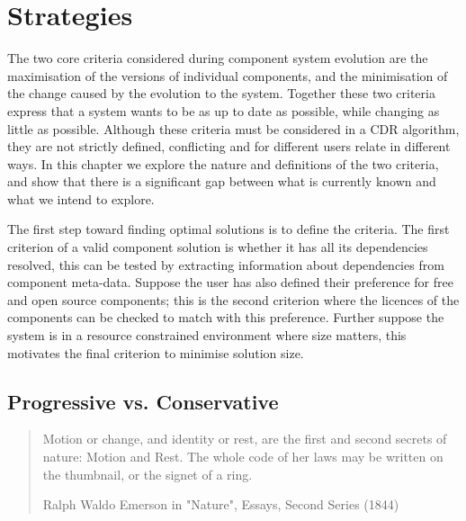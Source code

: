 \chapter{Strategies}
\label{strategies}

The two core criteria considered during component system evolution are the maximisation of the versions of individual components, 
and the minimisation of the change caused by the evolution to the system.
Together these two criteria express that a system wants to be as up to date as possible, while changing as little as possible.
Although these criteria must be considered in a CDR algorithm,
they are not strictly defined, conflicting and for different users relate in different ways.
In this chapter we explore the nature and definitions of the two criteria,
and show that there is a significant gap between what is currently known and what we intend to explore. 

The first step toward finding optimal solutions is to define the criteria.
The first criterion of a valid component solution is whether it has all its dependencies resolved,
this can be tested by extracting information about dependencies from component meta-data.
Suppose the user has also defined their preference for free and open source components;
this is the second criterion where the licences of the components can be checked to match with this preference.
Further suppose the system is in a resource constrained environment where size matters, 
this motivates the final criterion to minimise solution size.



\section{Progressive vs. Conservative}
\begin{quotation}
Motion or change, and identity or rest, are the first and second secrets of nature: Motion and Rest. 
The whole code of her laws may be written on the thumbnail, or the signet of a ring.

Ralph Waldo Emerson in "Nature", Essays, Second Series (1844)
\end{quotation}

